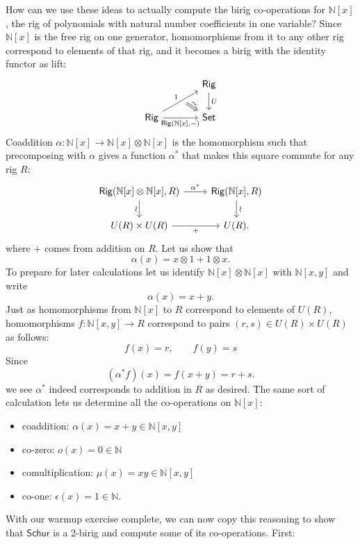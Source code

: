 \documentclass[12pt,reqno]{amsart}
\theoremstyle{plain}
\theoremstyle{definition}
\theoremstyle{remark}
\newcommand{\maps}{\colon}
\newcommand{\N}{\mathbb N}
\newcommand{\namedcat}[1]{\mathsf{#1}}
\newcommand{\Rig}{\namedcat{Rig}}
\newcommand{\Set}{\namedcat{Set}}
\newcommand{\Schur}{\namedcat{Schur}}
\numberwithin{thm}{section}
\begin{document}
How can we use these ideas to actually compute the birig co-operations for $\N[x]$, the rig of polynomials with natural number coefficients in one variable? Since $\N[x]$ is the free rig on one generator, homomorphisms from it to any other rig correspond to elements of that rig, and it becomes a birig with the identity functor as lift:
\[
\begin{tikzcd}[column sep = large]
    &
    \Rig
    \arrow[d, "U"]
    \\
    \Rig
    \arrow[ur, "1"]
    \arrow[ur, swap, ""{name = phi}, phantom, bend right = 5, pos = 0.6]
    \arrow[r, swap, "{\Rig(\N[x], -)}"]
    \arrow[from = phi, r, Rightarrow, "\sim", sloped]
    &
    \Set
\end{tikzcd}
\] 
Coaddition $\alpha \maps \N[x] \to \N[x] \otimes \N[x]$ is the homomorphism such that precomposing with $\alpha$ gives a function $\alpha^*$ that makes this square commute for any rig $R$:
\[  
\begin{tikzcd}
    \Rig(\N[x] \otimes \N[x], R) 
    \arrow[d, swap, "\sim", sloped]  
    \arrow[r, "\alpha^*"] 
    &
    \Rig(\N[x], R) 
    \arrow[d, "\sim", sloped] 
    \\
    U(R) \times U(R) 
    \arrow[r, swap, "+"] 
    &
    U(R).
    \end{tikzcd}
\]
where $+$ comes from addition on $R$. Let us show that
\[    
    \alpha(x) = x \otimes 1 + 1 \otimes x. 
\]
To prepare for later calculations let us identify $\N[x] \otimes \N[x]$ with $\N[x, y]$ and write
\[     
    \alpha(x) = x + y .
\]
Just as homomorphisms from $\N[x]$ to $R$ correspond to elements of $U(R)$, homomorphisms $f \maps \N[x, y] \to R$ correspond to pairs $(r, s) \in U(R) \times U(R)$ as follows:
\[      
    f(x) = r, \qquad   f(y) = s 
\]
Since
\[   
    (\alpha^* f)(x) = f(x + y) = r + s. 
\]
we see $\alpha^*$ indeed corresponds to addition in $R$ as desired. The same sort of calculation lets us determine all the co-operations on $\N[x]$:
\begin{itemize}
    \item coaddition: $\alpha(x) = x + y \in \N[x, y]$
    \item co-zero: $o(x) = 0 \in \N$
    \item comultiplication: $\mu(x) = xy \in \N[x, y]$
    \item co-one: $\epsilon(x) = 1 \in \N$.
\end{itemize}

With our warmup exercise complete, we can now copy this reasoning to show that $\Schur$ is a 2-birig and compute some of its co-operations. First:
\end{document}
